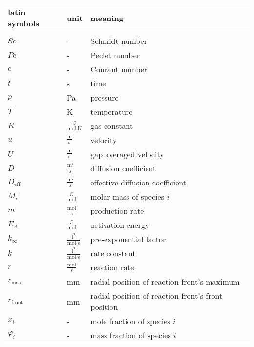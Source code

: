 \documentclass[../thesis.tex]{subfiles}
\begin{document}
	

\renewcommand*{\arraystretch}{1.2}
\small
\begin{tabular}{p{4cm}p{3cm}p{8cm}}
	\textbf{latin symbols} & \textbf{unit} & \textbf{meaning} \\ 
	\hline \\[\dimexpr-\normalbaselineskip+2pt]
	$Sc$ & - & Schmidt number \\
	$Pe$ & - & Peclet number \\
	$c$ & - & Courant number \\
	$t$ & s & time \\
	$p$ & Pa & pressure \\
	$T$ & K & temperature \\
	$R$ & $\frac{\text{J}}{\text{mol} \cdot \text{K}}$ & gas constant \\
	$u$ & $\frac{\text{m}}{\text{s}}$ & velocity \\
	$U$ & $\frac{\text{m}}{\text{s}}$ & gap averaged velocity \\
	$D$ & $\frac{\text{m²}}{s}$ & diffusion coefficient\\
	$D_{\text{eff}}$ & $\frac{\text{m²}}{s}$ & effective diffusion coefficient\\
	$M_i$ & $\frac{\text{g}}{\text{mol}}$ & molar mass of species $i$\\
	$m$ & $\frac{\text{mol}}{\text{s}}$ & production rate \\
	$E_A$ & $\frac{\text{J}}{\text{mol}}$ & activation energy \\
	$k_{\infty}$ & $\frac{\text{l}^2}{\text{mol} \cdot \text{s}}$ & pre-exponential factor \\
	$k$ & $\frac{\text{l}^2}{\text{mol} \cdot \text{s}}$ & rate constant \\
	$r$ & $\frac{\text{mol}}{\text{s}}$ & reaction rate \\
	$r_{\text{max}}$ & mm & radial position of reaction front's maximum \\
	$r_{\text{front}}$ & mm & radial position of reaction front's front position \\
	$x_i$ & - & mole fraction of species $i$\\
	$\varphi_i$ & - & mass fraction of species $i$\\
\end{tabular}
\vspace{1cm}
\end{document}
